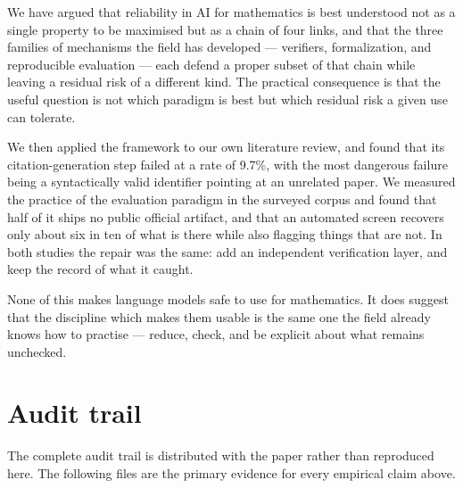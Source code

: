 \documentclass[11pt,a4paper]{article}
\begin{document}
We have argued that reliability in AI for mathematics is best understood not as
a single property to be maximised but as a chain of four links, and that the
three families of mechanisms the field has developed --- verifiers,
formalization, and reproducible evaluation --- each defend a proper subset of
that chain while leaving a residual risk of a different kind. The practical
consequence is that the useful question is not which paradigm is best but which
residual risk a given use can tolerate.

We then applied the framework to our own literature review, and found that its
citation-generation step failed at a rate of 9.7\%, with the most dangerous
failure being a syntactically valid identifier pointing at an unrelated paper.
We measured the practice of the evaluation paradigm in the surveyed corpus and
found that half of it ships no public official artifact, and that an automated
screen recovers only about six in ten of what is there while also flagging
things that are not. In both studies the repair was the same: add an
independent verification layer, and keep the record of what it caught.

None of this makes language models safe to use for mathematics. It does suggest
that the discipline which makes them usable is the same one the field already
knows how to practise --- reduce, check, and be explicit about what remains
unchecked.



\appendix
\section{Audit trail}
\label{app:audit}

The complete audit trail is distributed with the paper rather than reproduced
here. The following files are the primary evidence for every empirical claim
above.
\end{document}
